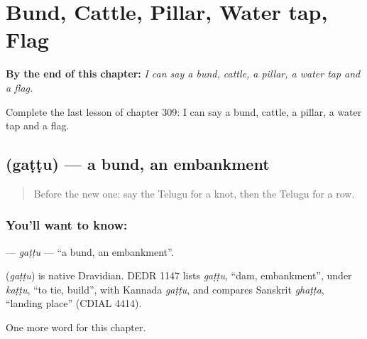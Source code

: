 
\chapter{Bund, Cattle, Pillar, Water tap, Flag}
\label{ch:te-bund-cattle-pillar-water-tap-flag}

\begin{chapteropening}
\textbf{By the end of this chapter:} \emph{I can say a bund, cattle, a pillar, a water tap and a flag.}

Complete the last lesson of chapter 309: I can say a bund, cattle, a pillar, a water tap and a flag.
\end{chapteropening}

\section[\texorpdfstring{\te{గట్టు} (gaṭṭu)}{గట్టు (gaṭṭu)}]{ (gaṭṭu) — a bund, an embankment}

\label{lesson:TE-C309-gattu}



\begin{quote}
Before the new one: say the Telugu for a knot, then the Telugu for a row.
\end{quote}

\subsection*{You'll want to know: }
\textbf{} — \emph{gaṭṭu} — \textquotedblleft{}a bund, an embankment\textquotedblright{}.

\begin{cousinweb}
\textbf{} (\emph{gaṭṭu}) is native Dravidian. DEDR 1147 lists \emph{gaṭṭu}, \textquotedblleft{}dam, embankment\textquotedblright{}, under \emph{kaṭṭu}, \textquotedblleft{}to tie, build\textquotedblright{}, with Kannada \emph{gaṭṭu}, and compares Sanskrit \emph{ghaṭṭa}, \textquotedblleft{}landing place\textquotedblright{} (CDIAL 4414).
\end{cousinweb}

\begin{grammarlens}[title={What you've built}]
One more word for this chapter.
\end{grammarlens}

